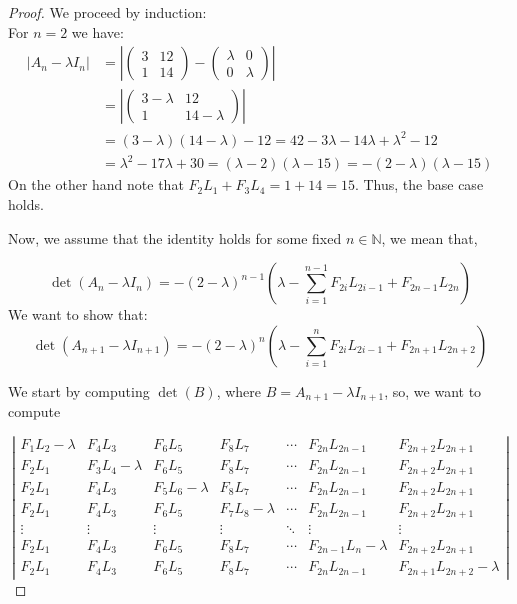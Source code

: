 \documentclass[11pt]{birkjour}
\theoremstyle{definition}
\theoremstyle{remark}
\numberwithin{equation}{section}
\begin{document}
\begin{proof} We proceed by induction: \\
For $n=2$ we have: 
\begin{align*}
\left|A_n-\lambda I_n\right|&=\left|\left(\begin{array}{ll}
3 & 12 \\
1 & 14
\end{array}\right)-\left(\begin{array}{ll}
\lambda & 0 \\
0 & \lambda
\end{array}\right)\right| \\
&=\left|\left(\begin{array}{cc}
3-\lambda & 12 \\
1 & 14-\lambda
\end{array}\right)\right|\\
& =(3-\lambda)(14-\lambda)-12 =42-3 \lambda-14 \lambda+\lambda^2-12 \\
& =\lambda^2-17 \lambda+30  =(\lambda-2)(\lambda-15) =-(2-\lambda)(\lambda-15)
\end{align*}
On the other hand note that $F_{2}L_{1}+F_{3}L_{4}=1+14=15$. Thus, the base case holds.    

\noindent Now, we assume that the identity holds for some fixed $n\in \mathbb{N}$, we mean that, 

$$
\operatorname{det}\left(A_n-\lambda I_n\right) =-(2-\lambda)^{n-1}\left(\lambda-\sum_{i=1}^{n-1}F_{2 i}L_{2i-1}+F_{2n-1}L_{2 n}\right)
$$
\noindent We want to show that: 
$$
\operatorname{det}\left(A_{n+1}-\lambda I_{n+1}\right)=-(2-\lambda)^n\left(\lambda-\sum_{i=1}^nF_{2i} L_{2 i-1}+F_{2 n+1} L_{2n+2}\right)
$$

\noindent We start by computing $\operatorname{det}\left(B\right)$, where $B=A_{n+1}-\lambda I_{n+1}$, so, we want to compute  

$$\left|\begin{array}{ccccccc}
F_1 L_2-\lambda & F_4 L_3 & F_6 L_5 & F_8 L_7 & \cdots & F_{2 n} L_{2 n-1} & F_{2 n+2} L_{2 n+1} \\
F_2 L_1 & F_3 L_4-\lambda & F_6 L_5 & F_8 L_7 & \cdots & F_{2 n} L_{2 n-1} & F_{2 n+2} L_{2 n+1} \\
F_2 L_1 & F_4 L_3 & F_5L_6-\lambda & F_8 L_7 & \cdots & F_{2 n} L_{2 n-1} & F_{2 n+2} L_{2 n+1} \\
F_2 L_1 & F_4 L_3 & F_6 L_5 & F_7 L_8-\lambda & \cdots & F_{2 n} L_{2 n-1} & F_{2 n+2} L_{2 n+1} \\
\vdots & \vdots & \vdots & \vdots & \ddots & \vdots & \vdots \\
F_2 L_1 & F_4 L_3 & F_6 L_5 & F_8 L_7 & \cdots & F_{2 n-1} L_n-\lambda & F_{2 n+2} L_{2 n+1} \\
F_2 L_1 & F_4 L_3 & F_6 L_5 & F_8 L_7 & \cdots & F_{2 n} L_{2 n-1} & F_{2 n+1} L_{2 n+2}-\lambda
\end{array}\right|$$


\end{proof}
\end{document}
